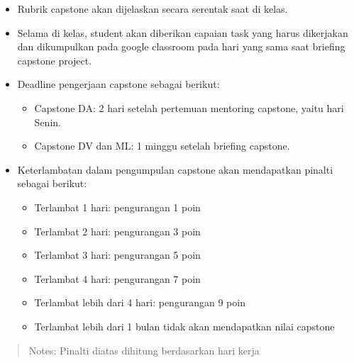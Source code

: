\documentclass[
]{book}
\providecommand{\tightlist}{%
  \setlength{\itemsep}{0pt}\setlength{\parskip}{0pt}}
\begin{document}
\begin{itemize}
\tightlist
\item
  Rubrik capstone akan dijelaskan secara serentak saat di kelas.
\item
  Selama di kelas, student akan diberikan capaian task yang harus dikerjakan dan dikumpulkan pada google classroom pada hari yang sama saat briefing capstone project.
\item
  Deadline pengerjaan capstone sebagai berikut:

  \begin{itemize}
  \tightlist
  \item
    Capstone DA: 2 hari setelah pertemuan mentoring capstone, yaitu hari Senin.
  \item
    Capstone DV dan ML: 1 minggu setelah briefing capstone.
  \end{itemize}
\item
  Keterlambatan dalam pengumpulan capstone akan mendapatkan pinalti sebagai berikut:

  \begin{itemize}
  \tightlist
  \item
    Terlambat 1 hari: pengurangan 1 poin
  \item
    Terlambat 2 hari: pengurangan 3 poin
  \item
    Terlambat 3 hari: pengurangan 5 poin
  \item
    Terlambat 4 hari: pengurangan 7 poin
  \item
    Terlambat lebih dari 4 hari: pengurangan 9 poin
  \item
    Terlambat lebih dari 1 bulan tidak akan mendapatkan nilai capstone
  \end{itemize}
\end{itemize}

\begin{quote}
Notes: Pinalti diatas dihitung berdasarkan hari kerja
\end{quote}
\end{document}
